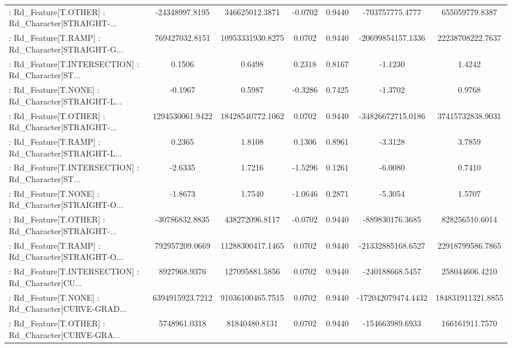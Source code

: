 \begin{longtable}{p{4cm}cccccc}
 : Rd\_Feature[T.OTHER] : Rd\_Character[STRAIGHT-... &    -24348997.8195 &    346625012.3871 & -0.0702 &       0.9440 &    -703757775.4777 &    655059779.8387 \\
 : Rd\_Feature[T.RAMP] : Rd\_Character[STRAIGHT-G... &    769427032.8151 &  10953331930.8275 &  0.0702 &       0.9440 &  -20699854157.1336 &  22238708222.7637 \\
 : Rd\_Feature[T.INTERSECTION] : Rd\_Character[ST... &            0.1506 &            0.6498 &  0.2318 &       0.8167 &            -1.1230 &            1.4242 \\
 : Rd\_Feature[T.NONE] : Rd\_Character[STRAIGHT-L... &           -0.1967 &            0.5987 & -0.3286 &       0.7425 &            -1.3702 &            0.9768 \\
 : Rd\_Feature[T.OTHER] : Rd\_Character[STRAIGHT-... &   1294530061.9422 &  18428540772.1062 &  0.0702 &       0.9440 &  -34826672715.0186 &  37415732838.9031 \\
 : Rd\_Feature[T.RAMP] : Rd\_Character[STRAIGHT-L... &            0.2365 &            1.8108 &  0.1306 &       0.8961 &            -3.3128 &            3.7859 \\
 : Rd\_Feature[T.INTERSECTION] : Rd\_Character[ST... &           -2.6335 &            1.7216 & -1.5296 &       0.1261 &            -6.0080 &            0.7410 \\
 : Rd\_Feature[T.NONE] : Rd\_Character[STRAIGHT-O... &           -1.8673 &            1.7540 & -1.0646 &       0.2871 &            -5.3054 &            1.5707 \\
 : Rd\_Feature[T.OTHER] : Rd\_Character[STRAIGHT-... &    -30786832.8835 &    438272096.8117 & -0.0702 &       0.9440 &    -889830176.3685 &    828256510.6014 \\
 : Rd\_Feature[T.RAMP] : Rd\_Character[STRAIGHT-O... &    792957209.0669 &  11288300417.1465 &  0.0702 &       0.9440 &  -21332885168.6527 &  22918799586.7865 \\
 : Rd\_Feature[T.INTERSECTION] : Rd\_Character[CU... &      8927968.9376 &    127095881.5856 &  0.0702 &       0.9440 &    -240188668.5457 &    258044606.4210 \\
 : Rd\_Feature[T.NONE] : Rd\_Character[CURVE-GRAD... &   6394915923.7212 &  91036100465.7515 &  0.0702 &       0.9440 & -172042079474.4432 & 184831911321.8855 \\
 : Rd\_Feature[T.OTHER] : Rd\_Character[CURVE-GRA... &      5748961.0318 &     81840480.8131 &  0.0702 &       0.9440 &    -154663989.6933 &    166161911.7570 \\

\end{longtable}
